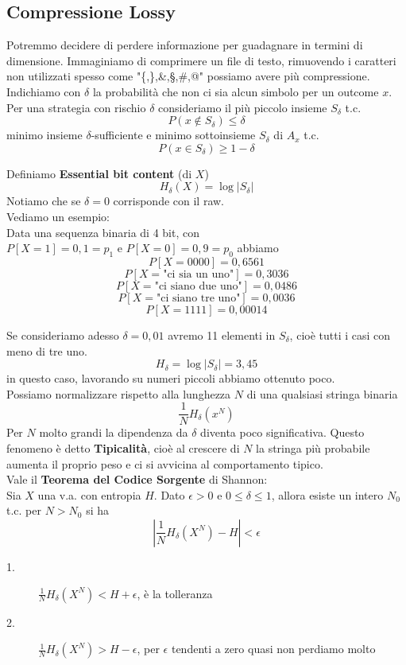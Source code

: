 \documentclass{report}
\begin{document}
\subsection{Compressione Lossy}
Potremmo decidere di perdere informazione per guadagnare in termini di dimensione. Immaginiamo di comprimere un file di testo, rimuovendo i caratteri non utilizzati spesso come "\{,\},\&,§,\#,@" possiamo avere più compressione. 
\\Indichiamo con $\delta$ la probabilità che non ci sia alcun simbolo per un outcome $x$.
\\Per una strategia con rischio $\delta$ consideriamo il più piccolo insieme $S_\delta$ t.c.
$$P(x\not \in S_\delta)\le \delta$$
minimo insieme $\delta$-sufficiente e minimo sottoinsieme $S_\delta$ di $A_x$ t.c.
$$P(x\in S_\delta)\ge 1- \delta$$

Definiamo \textbf{Essential bit content} (di $X$)
$$H_\delta(X)= \log \left|S_\delta\right|$$
Notiamo che se $\delta = 0$ corrisponde con il raw.
\\Vediamo un esempio:
\\Data una sequenza binaria di 4 bit, con \\$P[X=1]= 0,1 = p_1$ e $P[X=0]= 0,9 = p_0$ abbiamo
$$P[X=0000]=0,6561$$ $$P[X=\text{"ci sia un uno"}]=0,3036$$ $$P[X=\text{"ci siano due uno"}]=0,0486$$ $$P[X=\text{"ci siano tre uno"}]=0,0036$$ $$P[X=1111]=0,00014$$

Se consideriamo adesso $\delta = 0,01$ avremo 11 elementi in $S_\delta$, cioè tutti i casi con meno di tre uno.
$$H_\delta = \log \left|S_\delta \right| = 3,45$$
in questo caso, lavorando su numeri piccoli abbiamo ottenuto poco.
\\Possiamo normalizzare rispetto alla lunghezza $N$ di una qualsiasi stringa binaria
$$\frac{1}{N}H_\delta(x^N)$$
Per $N$  molto grandi la dipendenza da $\delta$ diventa poco significativa. Questo fenomeno è detto \textbf{Tipicalità}, cioè al crescere di $N$ la stringa più probabile aumenta il proprio peso e ci si avvicina al comportamento tipico.
\\Vale il \textbf{Teorema del Codice Sorgente} di Shannon:
\\Sia $X$ una v.a. con entropia $H$. Dato $\epsilon > 0$ e $0\le\delta\le 1$, allora esiste un intero $N_0$ t.c. per $N>N_0$ si ha $$\left| \frac{1}{N} H_\delta(X^N)-H \right| < \epsilon$$
\begin{description}
    \item[1.] $\frac{1}{N}H_\delta(X^N) < H +\epsilon$, è la tolleranza
    \item[2.] $\frac{1}{N}H_\delta(X^N) > H -\epsilon$, per $\epsilon$ tendenti a zero quasi non perdiamo molto
\end{description}
\end{document}
